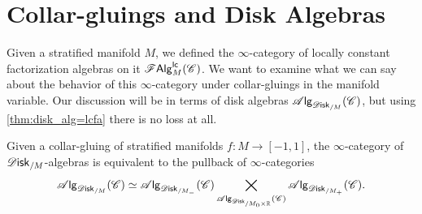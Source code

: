 \documentclass[../text]{subfiles}
\begin{document}
\section{Collar-gluings and Disk Algebras}\label{ch:gluing_disk_alg}

Given a stratified manifold $M$, we defined the $\infty$-category of locally constant factorization algebras on it $\mathscr{F} \mathsf{Alg}^{\mathsf{lc}}_M (\mathscr{C})$. We want to examine what we can say about the behavior of this $\infty$-category under collar-gluings in the manifold variable. Our discussion will be in terms of disk algebras $\alg{\disk_{/M}} (\catC)$, but using \cref{thm:disk_alg=lcfa} there is no loss at all.

\begin{theorem}\label{thm:gluing_alg_disk/M}
    Given a collar-gluing of stratified manifolds $f: M \rightarrow [-1,1]$, the $\infty$-category of $\disk_{/M}$-algebras is equivalent to the pullback of $\infty$-categories
    \begin{equation}
        \alg{\disk_{/M}} (\catC) \simeq \alg{\disk_{/M_-}} (\catC) \bigtimes_{\alg{\disk_{/M_0 \times \mathbb{R}}} (\catC)} \alg{\disk_{/M_+}} (\catC).
    \end{equation}
\end{theorem}
\end{document}
